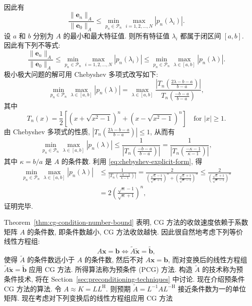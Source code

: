 \begin{Proof}
\[\begin{aligned}
\end{aligned}\]
{因此有}
\[\frac{\|\bm e_n\|_A}{\|\bm e_0\|_A}\le\min_{p_n\in\mathcal P_n}\max_{i=1,2,\ldots,N}|p_n(\lambda_i)|.\]
{设 $a$ 和 $b$ 分别为 $A$ 的最小和最大特征值. 则所有特征值 $\lambda_i$ 都属于闭区间 $[a,b]$. 因此有下列不等式:}
\[\frac{\|\bm e_n\|_A}{\|\bm e_0\|_A}\le\min_{p_n\in\mathcal P_n}\max_{i=1,2,\ldots,N}|p_n(\lambda_i)|\le\min_{p_n\in\mathcal P_n}\max_{\lambda\in[a,b]}|p_n(\lambda)|.\]
{极小极大问题的解可用 Chebyshev 多项式改写如下:}
\[\min_{p_n\in\mathcal P_n}\max_{\lambda\in[a,b]}|p_n(\lambda)|=\max_{\lambda\in[a,b]}\frac{|T_n(\frac{2\lambda-b-a}{b-a})|}{T_n(\frac{-b-a}{b-a})},\]
{其中}
\begin{equation}\label{eq:chebyshev-explicit-form}
T_n(x)=\frac12\left[\left(x+\sqrt{x^2-1}\right)^n+\left(x-\sqrt{x^2-1}\right)^n\right]\quad\text{for }|x|\ge1.
\end{equation}
{由 Chebyshev 多项式的性质, $|T_n(\frac{2\lambda-b-a}{b-a})|\le1$, 从而有}
\[\min_{p_n\in\mathcal P_n}\max_{\lambda\in[a,b]}|p_n(\lambda)|\le\frac1{|T_n(\frac{-b-a}{b-a})|}=\frac1{|T_n(\frac{-\kappa-1}{\kappa-1})|},\]
{其中 $\kappa=b/a$ 是 $A$ 的条件数. 利用 \eqref{eq:chebyshev-explicit-form}, 得}
\[\begin{aligned}
\min_{p_n\in\mathcal P_n}\max_{\lambda\in[a,b]}|p_n(\lambda)|&\le\frac1{|T_n(\frac{-\kappa-1}{\kappa-1})|}
=\frac2{\left(\frac{\sqrt\kappa-1}{\sqrt\kappa+1}\right)^n+\left(\frac{\sqrt\kappa+1}{\sqrt\kappa-1}\right)^n}
\le\frac2{\left(\frac{\sqrt\kappa+1}{\sqrt\kappa-1}\right)^n}\\
&=2\left(\frac{\sqrt\kappa-1}{\sqrt\kappa+1}\right)^n,
\end{aligned}\]
{证明完毕.}\end{Proof}
{Theorem\ \ref{thm:cg-condition-number-bound} 表明, CG 方法的收敛速度依赖于系数矩阵 $A$ 的条件数, 即条件数越小, CG 方法收敛越快. 因此很自然地考虑下列等价线性方程组:}
\[A\bm x=\bm b\Leftrightarrow\widetilde A\widetilde{\bm x}=\widetilde{\bm b},\]
{使得 $\widetilde A$ 的条件数远小于 $A$ 的条件数, 然后不对 $A\bm x=\bm b$, 而对变换后的线性方程组 $\widetilde A\widetilde{\bm x}=\widetilde{\bm b}$ 应用 CG 方法. 所得算法称为预条件 (PCG) 方法. 构造 $\widetilde A$ 的技术称为预条件技术, 将在 Section\ \ref{sec:preconditioning-techniques} 中讨论.}
{现在介绍预条件 CG 方法的算法. 令 $A\approx K=LL^{\mathrm H}$. 则预期 $\widetilde A=L^{-1}AL^{-\mathrm H}$ 接近条件数为一的单位矩阵. 现在考虑对下列变换后的线性方程组应用 CG 方法}
